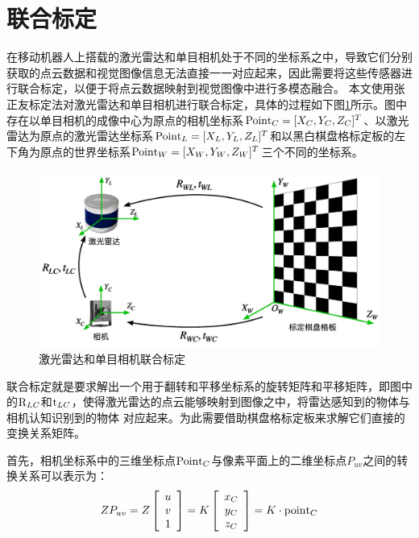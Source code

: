 \section{联合标定}
在移动机器人上搭载的激光雷达和单目相机处于不同的坐标系之中，导致它们分别获取的点云数据和视觉图像信息无法直接一一对应起来，因此需要将这些传感器进行联合标定，以便于将点云数据映射到视觉图像中进行多模态融合。
本文使用张正友标定法\cite{zhang2002flexible}对激光雷达和单目相机进行联合标定，具体的过程如下图\ref{Calibration}所示。图中存在以单目相机的成像中心为原点的相机坐标系${\rm{Poin}}{{\rm{t}}_C} = {[{X_C},{Y_C},{Z_C}]^T}$、以激光雷达为原点的激光雷达坐标系${\rm{Poin}}{{\rm{t}}_L} = {[{X_L},{Y_L},{Z_L}]^T}$和以黑白棋盘格标定板的左下角为原点的世界坐标系${\rm{Poin}}{{\rm{t}}_W} = {[{X_W},{Y_W},{Z_W}]^T}$三个不同的坐标系。
\begin{figure}[htbp]
    \centering
    \includegraphics[scale=0.48]{Fig/joinCalibration.png}
    \caption{\label{Calibration}激光雷达和单目相机联合标定}
\end{figure}
联合标定就是要求解出一个用于翻转和平移坐标系的旋转矩阵和平移矩阵，即图中的${\rm{R}}_{LC}$和${\rm{t}}_{LC}$，使得激光雷达的点云能够映射到图像之中，将雷达感知到的物体与相机认知识别到的物体 对应起来。为此需要借助棋盘格标定板来求解它们直接的变换关系矩阵。

首先，相机坐标系中的三维坐标点${\rm{Poin}}{{\rm{t}}_C}$与像素平面上的二维坐标点${P_{uv}}$之间的转换关系可以表示为：
\begin{equation}
Z{P_{uv}} = Z\left[ {\begin{array}{*{20}{c}}
u\\
v\\
1
\end{array}} \right] = K\left[ {\begin{array}{*{20}{c}}
{{x_C}}\\
{{y_C}}\\
{{z_C}}
\end{array}} \right] = K \cdot {\rm{poin}}{{\rm{t}}_C}
    \label{myeq1}
\end{equation}

